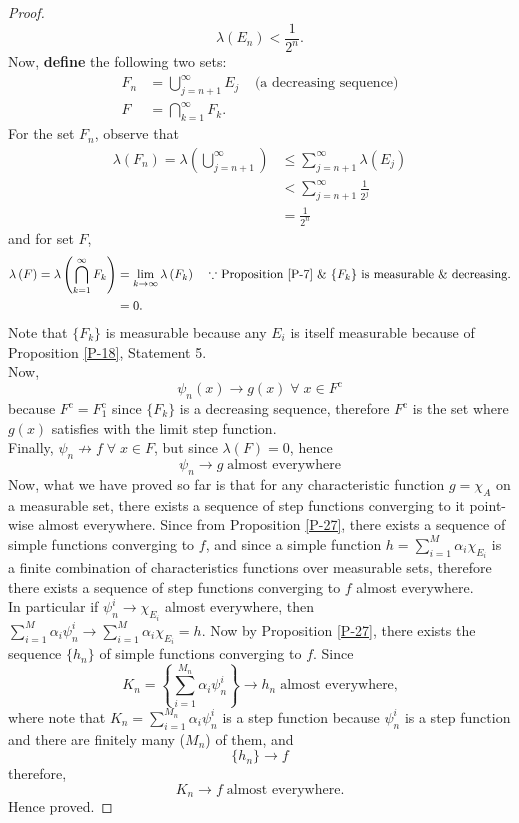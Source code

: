 \documentclass{article}
\theoremstyle{definition}
\theoremstyle{remark}
\theoremstyle{definition}
\theoremstyle{definition}
\theoremstyle{definition}
\newcommand{\bunion}{\bigcup}
\newcommand{\bintrs}{\bigcap}
\newcommand{\comp}[1]{#1^{\text{c}}}
\newcommand{\lm}[1]{\lambda\left (#1\right )}
\begin{document}
\begin{proof}
\[\lm{E_n} < \frac{1}{2^n}.\]
Now, \textbf{define} the following two sets:
\begin{equation*}
	\begin{split}
		F_n &= \bunion_{j=n+1}^\infty E_j\;\;\;\;\text{(a decreasing sequence)}\\
		F &= \bintrs_{k=1}^{\infty} F_k.
	\end{split}
\end{equation*}
For the set $ F_n $, observe that 
\begin{equation*}
	\begin{split}
		\lm{F_n} = \lm{\bunion_{j=n+1}^{\infty}} &\le \sum_{j=n+1}^{\infty} \lm{E_j}\\
		&< \sum_{j=n+1}^{\infty} \frac{1}{2^{j}}\\
		&= \frac{1}{2^n}
	\end{split}
\end{equation*}
and for set $ F $,
\begin{equation*}
	\begin{split}
		\lm{F} = \lm{\bintrs_{k=1}^{\infty} F_k} &= \lim_{k\to \infty} \lm{F_k}\;\;\;\;\text{$ \because $ Proposition \ref{P-7} \& $ \{F_k\} $ is measurable \& decreasing.} \\
		 &= 0.
	\end{split}
\end{equation*}
Note that $ \{F_k\} $ is measurable because any $ E_i $ is itself measurable because of Proposition \ref{P-18}, Statement 5.\\
Now, 
\[\psi_n(x) \longrightarrow g(x)\;\forall\;x\in \comp{F}\]
because $ \comp{F} = \comp{F_1} $ since $ \{F_k\} $ is a decreasing sequence, therefore $ \comp{F} $ is the set where $ g(x) $ satisfies with the limit step function.\\
Finally, $ \psi_n \not\to f\;\forall \;x\in F $, but since $ \lm{F} = 0 $, hence
\[\psi_n \longrightarrow g \;\text{almost everywhere}\]
Now, what we have proved so far is that for any characteristic function $ g = \chi_A $ on a measurable set, there exists a sequence of step functions converging to it point-wise almost everywhere. Since from Proposition \ref{P-27}, there exists a sequence of simple functions converging to $ f $, and since a simple function $ h = \sum_{i=1}^{M} \alpha_i \chi_{E_i}$ is a finite combination of characteristics functions over measurable sets, therefore there exists a sequence of step functions converging to $ f $ almost everywhere. \\
In particular if $ \psi^{i}_{n} \longrightarrow \chi_{E_i} $ almost everywhere, then $ \sum_{i=1}^{M} \alpha_i \psi_n^{i} \longrightarrow \sum_{i=1}^{M}\alpha_i \chi_{E_i} = h$. Now by Proposition \ref{P-27}, there exists the sequence $ \{h_n\} $ of simple functions converging to $ f $. Since 
\[K_n = \left \{\sum_{i=1}^{M_n} \alpha_i \psi_n^i\right \} \longrightarrow h_n\;\text{almost everywhere,}\]
where note that $K_n = \sum_{i=1}^{M_n} \alpha_i \psi_n^i  $ is a step function because $ \psi_n^i $ is a step function and there are finitely many ($ M_n $) of them, and
\[\{h_n\}\longrightarrow f\]
therefore,
\[K_n \longrightarrow f\;\text{almost everywhere.}\]
Hence proved.
\end{proof}
\hrulefill
\end{document}
